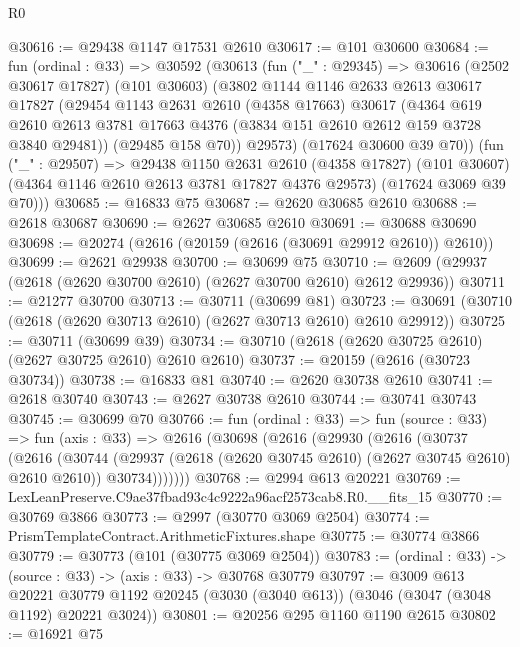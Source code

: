\begin{lexlean}{R0}
\begin{coremodule}
@30616 := @29438 @1147 @17531 @2610
@30617 := @101 @30600
@30684 := fun (ordinal : @33) =>
  @30592
    (@30613
      (fun ("_" : @29345) =>
      @30616
        (@2502 @30617 @17827)
        (@101 @30603)
        (@3802
          @1144
          @1146
          @2633
          @2613
          @30617
          @17827
          (@29454
            @1143
            @2631
            @2610
            (@4358 @17663)
            @30617
            (@4364
              @619
              @2610
              @2613
              @3781
              @17663
              @4376
              (@3834 @151 @2610 @2612 @159 @3728 @3840 @29481))
            (@29485 @158 @70))
          @29573)
        (@17624 @30600 @39 @70))
      (fun ("_" : @29507) =>
      @29438
        @1150
        @2631
        @2610
        (@4358 @17827)
        (@101 @30607)
        (@4364 @1146 @2610 @2613 @3781 @17827 @4376 @29573)
        (@17624 @3069 @39 @70)))
@30685 := @16833 @75
@30687 := @2620 @30685 @2610
@30688 := @2618 @30687
@30690 := @2627 @30685 @2610
@30691 := @30688 @30690
@30698 := @20274 (@2616 (@20159 (@2616 (@30691 @29912 @2610)) @2610))
@30699 := @2621 @29938
@30700 := @30699 @75
@30710 := @2609 (@29937 (@2618 (@2620 @30700 @2610) (@2627 @30700 @2610) @2612 @29936))
@30711 := @21277 @30700
@30713 := @30711 (@30699 @81)
@30723 := @30691 (@30710 (@2618 (@2620 @30713 @2610) (@2627 @30713 @2610) @2610 @29912))
@30725 := @30711 (@30699 @39)
@30734 := @30710 (@2618 (@2620 @30725 @2610) (@2627 @30725 @2610) @2610 @2610)
@30737 := @20159 (@2616 (@30723 @30734))
@30738 := @16833 @81
@30740 := @2620 @30738 @2610
@30741 := @2618 @30740
@30743 := @2627 @30738 @2610
@30744 := @30741 @30743
@30745 := @30699 @70
@30766 := fun (ordinal : @33) =>
  fun (source : @33) =>
  fun (axis : @33) =>
  @2616
    (@30698
      (@2616
        (@29930
          (@2616
            (@30737
              (@2616
                (@30744
                  (@29937 (@2618 (@2620 @30745 @2610) (@2627 @30745 @2610) @2610 @2610))
                  @30734)))))))
@30768 := @2994 @613 @20221
@30769 := LexLeanPreserve.C9ae37fbad93c4c9222a96acf2573cab8.R0.__fits_15
@30770 := @30769 @3866
@30773 := @2997 (@30770 @3069 @2504)
@30774 := PrismTemplateContract.ArithmeticFixtures.shape
@30775 := @30774 @3866
@30779 := @30773 (@101 (@30775 @3069 @2504))
@30783 := (ordinal : @33) -> (source : @33) -> (axis : @33) -> @30768 @30779
@30797 := @3009
    @613
    @20221
    @30779
    @1192
    @20245
    (@3030 (@3040 @613))
    (@3046 (@3047 (@3048 @1192) @20221 @3024))
@30801 := @20256 @295 @1160 @1190 @2615
@30802 := @16921 @75

\end{coremodule}
\end{lexlean}
